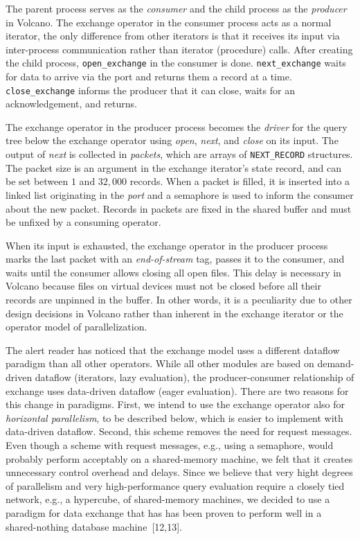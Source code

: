 \documentclass[a4paper,11pt,notitlepage,twoside,openright]{article}
\begin{document}
The parent process serves as the \emph{consumer} and the
child process as the \emph{producer} in Volcano. The exchange
operator in the consumer process acts as a normal iterator,
the only difference from other iterators is that it receives its
input via inter-process communication rather than iterator
(procedure) calls. After creating the child process,
\texttt{open\_exchange} in the consumer is done. \texttt{next\_exchange}
waits for data to arrive via the port and returns them a
record at a time. \texttt{close\_exchange} informs the producer that
it can close, waits for an acknowledgement, and returns.

The exchange operator in the producer process
becomes the \emph{driver} for the query tree below the exchange
operator using \emph{open}, \emph{next}, and \emph{close} on its input. The output
of \emph{next} is collected in \emph{packets}, which are arrays of
\texttt{NEXT\_RECORD} structures. The packet size is an argument
in the exchange iterator's state record, and can be set
between \(1\) and \(32,000\) records. When a packet is filled, it
is inserted into a linked list originating in the \emph{port} and a
semaphore is used to inform the consumer about the new
packet. Records in packets are fixed in the shared buffer
and must be unfixed by a consuming operator.

When its input is exhausted, the exchange operator in
the producer process marks the last packet with an \emph{end-of-stream}
tag, passes it to the consumer, and waits until the
consumer allows closing all open files. This delay is
necessary in Volcano because files on virtual devices must
not be closed before all their records are unpinned in the
buffer. In other words, it is a peculiarity due to other
design decisions in Volcano rather than inherent in the
exchange iterator or the operator model of parallelization.

The alert reader has noticed that the exchange model
uses a different dataflow paradigm than all other operators.
While all other modules are based on demand-driven
dataflow (iterators, lazy evaluation), the producer-consumer
relationship of exchange uses data-driven dataflow (eager
evaluation). There are two reasons for this change in paradigms.
First, we intend to use the exchange operator also
for \emph{horizontal parallelism}, to be described below, which is
easier to implement with data-driven dataflow. Second, this
scheme removes the need for request messages. Even
though a scheme with request messages, e.g., using a semaphore,
would probably perform acceptably on a shared-memory
machine, we felt that it creates unnecessary control
overhead and delays. Since we believe that very hight
degrees of parallelism and very high-performance query
evaluation require a closely tied network, e.g., a hypercube,
of shared-memory machines, we decided to use a paradigm
for data exchange that has has been proven to perform well
in a shared-nothing database machine~{[12,13]}.
\end{document}
